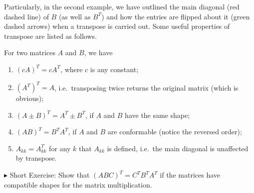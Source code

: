 Particularly, in the second example, we have outlined the main diagonal (red dashed line) of $B$ (as well as $B^T$) and how the entries are flipped about it (green dashed arrows) when a transpose is carried out. Some useful properties of transpose are listed as follows.
\begin{proper}
\label{proper:transp}
For two matrices $A$ and $B$, we have
\begin{enumerate}
\item $(cA)^T = cA^T$, where $c$ is any constant;
\item $(A^T)^T = A$, i.e.\ transposing twice returns the original matrix (which is obvious);
\item $(A \pm B)^T = A^T \pm B^T$, if $A$ and $B$ have the same shape;
\item $(AB)^T = B^TA^T$, if $A$ and $B$ are conformable (notice the reversed order);
\item $A_{kk} = A^T_{kk}$ for any $k$ that $A_{kk}$ is defined, i.e.\ the main diagonal is unaffected by transpose.
\end{enumerate}
\end{proper}
$\blacktriangleright$ Short Exercise: Show that $(ABC)^T = C^TB^TA^T$ if the matrices have compatible shapes for the matrix multiplication.\footnotemark

